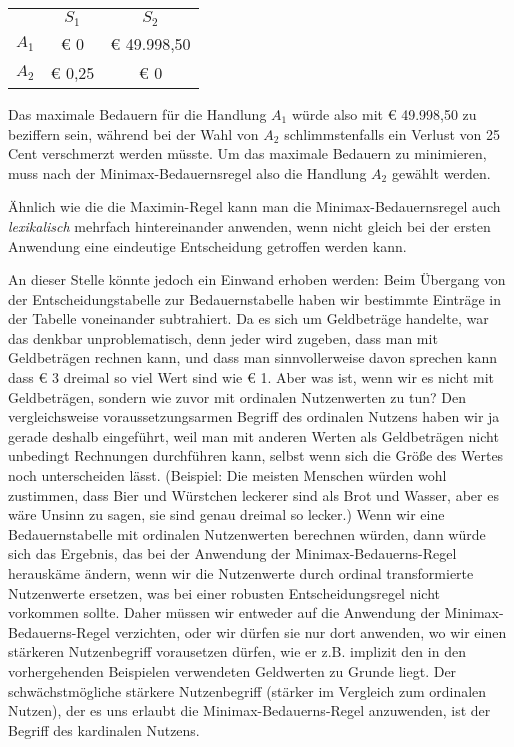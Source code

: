 \begin{center}
\begin{tabular}{c|c|c|}
\multicolumn{1}{c}{} & \multicolumn{1}{c}{$S_1$} & \multicolumn{1}{c}{$S_2$} \\
\cline{2-3}
$A_1$ & € 0    & € 49.998,50 \\ \cline{2-3}
$A_2$ & € 0,25 & € 0 \\ \cline{2-3}
\end{tabular}
\end{center}

Das maximale Bedauern für die Handlung $A_1$ würde also mit € 49.998,50 zu
beziffern sein, während bei der Wahl von $A_2$ schlimmstenfalls ein Verlust
von 25 Cent verschmerzt werden müsste. Um das maximale Bedauern zu minimieren,
muss nach der Minimax-Bedauernsregel also die Handlung $A_2$ gewählt werden.

Ähnlich wie die die Maximin-Regel kann man die Minimax-Be\-dauerns\-regel auch
{\em lexikalisch} mehr\-fach hintereinander anwenden, wenn nicht gleich bei der
ersten Anwendung eine eindeutige Entscheidung getroffen werden kann.

An dieser Stelle könnte jedoch ein Einwand erhoben werden: Beim Übergang von der
Entscheidungstabelle zur Bedauernstabelle haben wir bestimmte Einträge in der
Tabelle voneinander subtrahiert. 
Da es sich um Geldbeträge handelte, war das
denkbar unproblematisch, denn jeder wird zugeben, dass man mit Geldbeträgen
rechnen kann, und dass man sinnvollerweise davon sprechen kann dass € 3 dreimal
so viel Wert sind wie € 1. Aber was ist, wenn wir es nicht mit Geldbeträgen,
sondern wie zuvor mit ordinalen Nutzenwerten zu tun? Den vergleichsweise
voraussetzungsarmen Begriff des ordinalen Nutzens haben wir ja gerade deshalb
eingeführt, weil man mit anderen Werten als Geldbeträgen nicht unbedingt
Rechnungen durchführen kann, selbst wenn sich die Größe des Wertes noch
unterscheiden lässt. (Beispiel: Die meisten Menschen würden wohl zustimmen, dass
Bier und Würstchen leckerer sind als Brot und Wasser, aber es wäre Unsinn zu
sagen, sie sind genau dreimal so lecker.) Wenn wir eine Bedauernstabelle mit
ordinalen Nutzenwerten berechnen würden, dann würde sich das Ergebnis, das bei
der Anwendung der Minimax-Bedauerns-Regel herauskäme ändern, wenn wir die
Nutzenwerte durch ordinal transformierte Nutzenwerte ersetzen, was bei einer
robusten Entscheidungsregel nicht vorkommen sollte. Daher müssen wir entweder auf
die Anwendung der Minimax-Bedauerns-Regel verzichten, oder wir dürfen sie nur
dort anwenden, wo wir einen stärkeren Nutzenbegriff vorausetzen dürfen, wie er
z.B. implizit den in den vorhergehenden Beispielen verwendeten Geldwerten zu
Grunde liegt. Der schwächstmögliche stärkere Nutzenbegriff (stärker im Vergleich
zum ordinalen Nutzen), der es uns erlaubt die Minimax-Bedauerns-Regel anzuwenden,
ist der Begriff des kardinalen Nutzens. 

